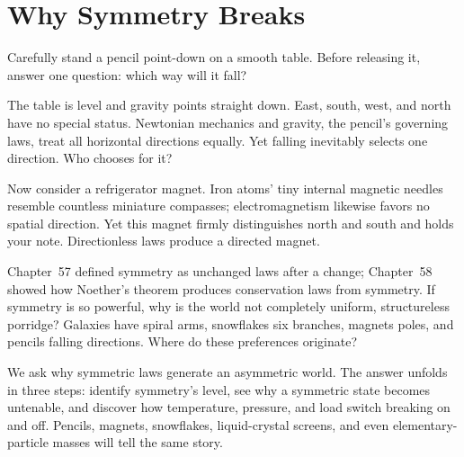 \chapter{Why Symmetry Breaks}


\begin{mainline}
Carefully stand a pencil point-down on a smooth table. Before releasing it, answer one question: which way will it fall?

The table is level and gravity points straight down. East, south, west, and north have no special status. Newtonian mechanics and gravity, the pencil's governing laws, treat all horizontal directions equally. Yet falling inevitably selects one direction. Who chooses for it?

Now consider a refrigerator magnet. Iron atoms' tiny internal magnetic needles resemble countless miniature compasses; electromagnetism likewise favors no spatial direction. Yet this magnet firmly distinguishes north and south and holds your note. Directionless laws produce a directed magnet.

Chapter~57 defined symmetry as unchanged laws after a change; Chapter~58 showed how Noether's theorem produces conservation laws from symmetry. If symmetry is so powerful, why is the world not completely uniform, structureless porridge? Galaxies have spiral arms, snowflakes six branches, magnets poles, and pencils falling directions. Where do these preferences originate?

We ask why symmetric laws generate an asymmetric world. The answer unfolds in three steps: identify symmetry's level, see why a symmetric state becomes untenable, and discover how temperature, pressure, and load switch breaking on and off. Pencils, magnets, snowflakes, liquid-crystal screens, and even elementary-particle masses will tell the same story.
\end{mainline}


